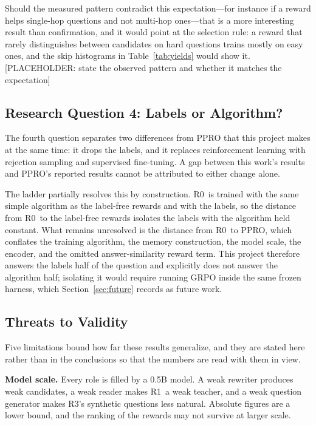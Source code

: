 \documentclass[12pt,letterpaper,oneside]{report}
\newcommand{\ph}[1]{\textcolor{phtext}{[\textsf{\footnotesize PLACEHOLDER: #1}]}}
\newcommand{\Rz}{R0}
\newcommand{\Ra}{R1}
\newcommand{\Rc}{R3}
\begin{document}
Should the measured pattern contradict this expectation---for instance if a
reward helps single-hop questions and not multi-hop ones---that is a more
interesting result than confirmation, and it would point at the selection rule:
a reward that rarely distinguishes between candidates on hard questions trains
mostly on easy ones, and the skip histograms in Table~\ref{tab:yields} would
show it.
\ph{state the observed pattern and whether it matches the expectation}

\subsection{Research Question 4: Labels or Algorithm?}

The fourth question separates two differences from PPRO that this project makes
at the same time: it drops the labels, and it replaces reinforcement learning
with rejection sampling and supervised fine-tuning. A gap between this work's
results and PPRO's reported results cannot be attributed to either change
alone.

The ladder partially resolves this by construction. \Rz\ is trained with the
same simple algorithm as the label-free rewards and with the labels, so the
distance from \Rz\ to the label-free rewards isolates the labels with the
algorithm held constant. What remains unresolved is the distance from \Rz\ to
PPRO, which conflates the training algorithm, the memory construction, the
model scale, the encoder, and the omitted answer-similarity reward term. This
project therefore answers the labels half of the question and explicitly does
not answer the algorithm half; isolating it would require running GRPO inside
the same frozen harness, which Section~\ref{sec:future} records as future work.

\subsection{Threats to Validity}
\label{sec:threats}

Five limitations bound how far these results generalize, and they are stated
here rather than in the conclusions so that the numbers are read with them in
view.

\textbf{Model scale.} Every role is filled by a 0.5B model. A weak rewriter
produces weak candidates, a weak reader makes \Ra\ a weak teacher, and a weak
question generator makes \Rc's synthetic questions less natural. Absolute
figures are a lower bound, and the ranking of the rewards may not survive at
larger scale.
\end{document}

